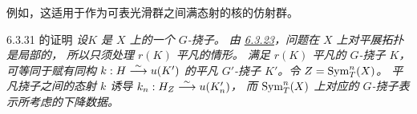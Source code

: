 例如，这适用于作为可表光滑群之间满态射的核的仿射群。

\begin{enonce*}{6.3.31 的证明}
\emph{设\pageoriginale $K$ 是 $X$ 上的一个 $G$-挠子。
由 \hyperref[XVII.prop6.3.23]{6.3.23}，问题在 $X$ 上对平展拓扑是局部的，
所以只须处理 $r(K)$ 平凡的情形。
满足 $r(K)$ 平凡的 $G$-挠子 $K$，可等同于赋有同构 $k:H\overset{\sim}{\longrightarrow} u(K')$
的平凡 $G'$-挠子 $K'$。令 $Z=\operatorname{Sym}^{n}_{T}(X)$。
平凡挠子之间的态射 $k$ 诱导 $k_{n}:H_{Z}\overset{\sim}{\longrightarrow} u(K'_{n})$，
而 $\operatorname{Sym}^{n}_T(X)$ 上对应的 $G$-挠子表示所考虑的下降数据。}
\end{enonce*}
